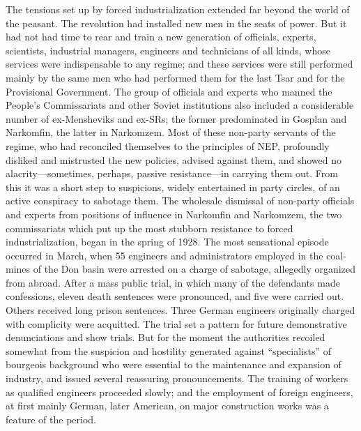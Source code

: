 The tensions set up by forced industrialization extended far beyond the world of the peasant. The revolution had installed new men in the seats of power. But it had not had time to rear and train a new generation of officials, experts, scientists, industrial managers, engineers and technicians of all kinds, whose services were indispensable to any regime; and these services were still performed mainly by the same men who had performed them for the last Tsar and for the Provisional Government. The group of officials and experts who manned the People's Commissariats and other Soviet institutions also included a considerable number of ex-Mensheviks and ex-SRs; the former predominated in Gosplan and Narkomfin, the latter in Narkomzem. Most of these non-party servants of the regime, who had reconciled themselves to the principles of NEP, profoundly disliked and mistrusted the new policies, advised against them, and showed no alacrity---sometimes, perhaps, passive resistance---in carrying them out. From this it was a short step to suspicions, widely entertained in party circles, of an active conspiracy to sabotage them. The wholesale dismissal of non-party officials and experts from positions of influence in Narkomfin and Narkomzem, the two commissariats which put up the most stubborn resistance to forced industrialization, began in the spring of 1928. The most sensational episode occurred in March, when 55 engineers and administrators employed in the coal-mines of the Don basin were arrested on a charge of sabotage, allegedly organized from abroad. After a mass public trial, in which many of the defendants made confessions, eleven death sentences were pronounced, and five were carried out. Others received long prison sentences. Three German engineers originally charged with complicity were acquitted. The trial set a pattern for future demonstrative denunciations and show trials. But for the moment the authorities recoiled somewhat from the suspicion and hostility generated against ``specialists'' of bourgeois background who were essential to the maintenance and expansion of industry, and issued several reassuring pronouncements. The training of workers as qualified engineers proceeded slowly; and the employment of foreign engineers, at first mainly German, later American, on major construction works was a feature of the period. 


